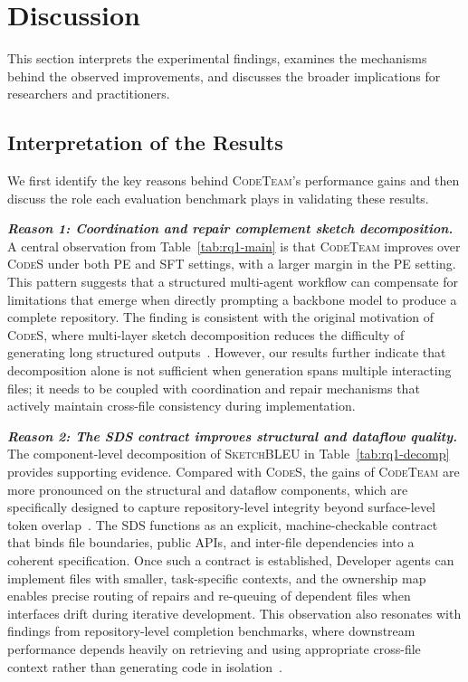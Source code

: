 \documentclass[format=acmsmall, review=false, screen=true]{acmart}
\newcommand{\fakesection}[2][1em]{\vspace{#1}\noindent\textit{\textbf{#2}}}
\newcommand{\tool}{\textsc{CodeTeam}\xspace}
\newcommand{\codes}{\textsc{CodeS}\xspace}
\newcommand{\sketchbleu}{\textsc{SketchBLEU}\xspace}
\begin{document}
\section{Discussion}
\label{sec:discussion}

This section interprets the experimental findings, examines the mechanisms behind the observed improvements, and discusses the broader implications for researchers and practitioners.

\subsection{Interpretation of the Results}
\label{subsec:disc-interp}

We first identify the key reasons behind \tool's performance gains and then discuss the role each evaluation benchmark plays in validating these results.

\fakesection{Reason 1: Coordination and repair complement sketch decomposition.}
A central observation from Table~\ref{tab:rq1-main} is that \tool improves over \codes under both PE and SFT settings, with a larger margin in the PE setting.
This pattern suggests that a structured multi-agent workflow can compensate for limitations that emerge when directly prompting a backbone model to produce a complete repository.
The finding is consistent with the original motivation of \codes, where multi-layer sketch decomposition reduces the difficulty of generating long structured outputs~\cite{Zan2025CodeS}.
However, our results further indicate that decomposition alone is not sufficient when generation spans multiple interacting files; it needs to be coupled with coordination and repair mechanisms that actively maintain cross-file consistency during implementation.

\fakesection{Reason 2: The SDS contract improves structural and dataflow quality.}
The component-level decomposition of \sketchbleu in Table~\ref{tab:rq1-decomp} provides supporting evidence.
Compared with \codes, the gains of \tool are more pronounced on the structural and dataflow components, which are specifically designed to capture repository-level integrity beyond surface-level token overlap~\cite{Zan2025CodeS}.
The SDS functions as an explicit, machine-checkable contract that binds file boundaries, public APIs, and inter-file dependencies into a coherent specification.
Once such a contract is established, Developer agents can implement files with smaller, task-specific contexts, and the ownership map enables precise routing of repairs and re-queuing of dependent files when interfaces drift during iterative development.
This observation also resonates with findings from repository-level completion benchmarks, where downstream performance depends heavily on retrieving and using appropriate cross-file context rather than generating code in isolation~\cite{Liu2023RepoBench,Zhang2023RepoCoder}.
\end{document}
